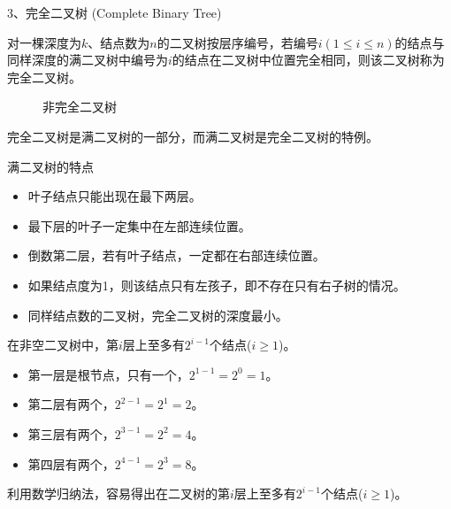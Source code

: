 \begin{frame}\ft{\subsubsecname}
  3、完全二叉树 (Complete Binary Tree)
  


对一棵深度为$k$、结点数为$n$的二叉树按层序编号，若编号$i(1\le i \le n)$的结点与同样深度的满二叉树中编号为$i$的结点在二叉树中位置完全相同，则该二叉树称为完全二叉树。
%
%
%
\begin{figure}
\centering

\end{figure}
\end{frame}
%
\begin{frame}\ft{\subsubsecname}
\begin{figure}
\centering

\caption{非完全二叉树}
\end{figure}
\end{frame}
%
\begin{frame}\ft{\subsubsecname}
完全二叉树是满二叉树的一部分，而满二叉树是完全二叉树的特例。

\textcolor{acolor5}{满二叉树的特点}
  \begin{itemize}
  \item 叶子结点只能出现在最下两层。
  \item 最下层的叶子一定集中在左部连续位置。
  \item 倒数第二层，若有叶子结点，一定都在右部连续位置。
  \item 如果结点度为1，则该结点只有左孩子，即不存在只有右子树的情况。
  \item 同样结点数的二叉树，完全二叉树的深度最小。
  \end{itemize}


\end{frame}
%
%
\begin{frame}
\begin{xingzhi}[1]
在非空二叉树中，第$i$层上至多有$2^{i-1}$个结点($i\ge 1$)。
\end{xingzhi}

\begin{itemize}
\item 第一层是根节点，只有一个，$2^{1-1}=2^0=1$。
\item 第二层有两个，$2^{2-1}=2^1=2$。
\item 第三层有两个，$2^{3-1}=2^2=4$。
\item 第四层有两个，$2^{4-1}=2^3=8$。
\end{itemize}
利用数学归纳法，容易得出在二叉树的第$i$层上至多有$2^{i-1}$个结点($i\ge 1$)。
\end{frame}
